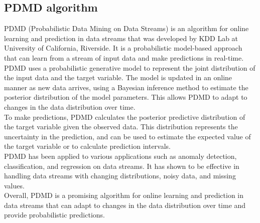         \subsection{PDMD algorithm}
        PDMD (Probabilistic Data Mining on Data Streams) is an algorithm for online learning and prediction in data streams that was
        developed by KDD Lab at University of California, Riverside. It is a probabilistic model-based approach that can learn from a stream of input
        data and make predictions in real-time.
        \\
        PDMD uses a probabilistic generative model to represent the joint distribution of the input data and the target variable.
        The model is updated in an online manner as new data arrives, using a Bayesian inference method to estimate the posterior
        distribution of the model parameters. This allows PDMD to adapt to changes in the data distribution over time.
        \\
        To make predictions, PDMD calculates the posterior predictive distribution of the target variable given the observed data.
        This distribution represents the uncertainty in the prediction, and can be used to estimate the expected value of the target
        variable or to calculate prediction intervals.
        \\
        PDMD has been applied to various applications such as anomaly detection, classification, and regression on data streams.
        It has shown to be effective in handling data streams with changing distributions, noisy data, and missing values.
        \\
        Overall, PDMD is a promising algorithm for online learning and prediction in data streams that can adapt to changes in the data distribution
        over time and provide probabilistic predictions.
